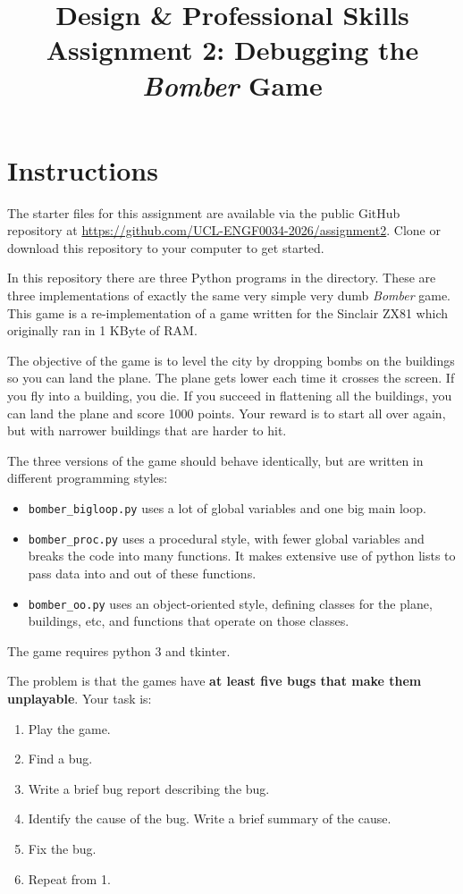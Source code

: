 \documentclass{article}
\title{Design \& Professional Skills\\
  Assignment 2: Debugging the {\em Bomber} Game}
\author{}
\date{}
\begin{document}
\maketitle

\section*{Instructions}

The starter files for this assignment are available via the public GitHub repository at \url{https://github.com/UCL-ENGF0034-2026/assignment2}. Clone or download this repository to your computer to get started.

In this repository there are three Python programs in the directory.  These
are three implementations of exactly the same very simple very dumb
{\em Bomber} game. This game is a re-implementation of a game written for
the Sinclair ZX81 which originally ran in 1 KByte of RAM.

The objective of the game is to level the city by dropping bombs on
the buildings so you can land the plane.  The plane gets lower each
time it crosses the screen.  If you fly into a building, you die.  If
you succeed in flattening all the buildings, you can land the plane
and score 1000 points.  Your reward is to start all over again, but
with narrower buildings that are harder to hit.  

The three versions of the game should behave identically, but are written in different programming styles:
\begin{itemize}
\item {\tt bomber\_bigloop.py} uses a lot of global variables and one big main loop.
\item{\tt bomber\_proc.py} uses a procedural style, with fewer global variables and breaks the code into many functions.  It makes extensive use of python lists to pass data into and out of these functions.
\item{\tt bomber\_oo.py} uses an object-oriented style, defining classes for the plane, buildings, etc, and functions that operate on those classes.
\end{itemize}
The game requires python 3 and tkinter.

The problem is that the games have \textbf{at least five bugs that make them unplayable}.  Your task is:
\begin{enumerate}
\item Play the game.
\item Find a bug.
\item Write a brief bug report describing the bug.
\item Identify the cause of the bug.  Write a brief summary of the cause.
\item Fix the bug.
\item Repeat from 1.
\end{enumerate}
\end{document}
